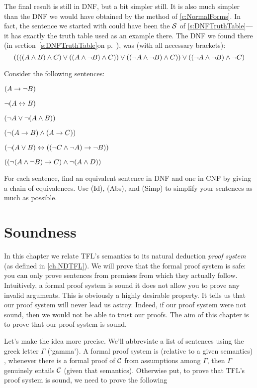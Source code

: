 The final result is still in DNF, but a bit simpler still.  It is also much simpler than the DNF we would have obtained by the method of \cref{c:NormalForms}. In fact, the sentence we started with could have been the $\mathcal{S}$ of \cref{s:DNFTruthTable}---it has exactly the truth table used as an example there. The DNF we found there (\ifHTMLtarget in section~\cref{s:DNFTruthTable}\else on p.~\pageref{longDNF}\fi), was (with all necessary brackets):
$$((((A \wedge B) \wedge C) \vee ((A \wedge \neg B) \wedge C)) \vee ((\neg A \wedge \neg B) \wedge C)) \vee ((\neg A \wedge \neg B) \wedge \neg C)$$

\practiceproblems
\problempart
\label{pr.DNF2}
Consider the following sentences:
\begin{compactlist}
	\item $(A \rightarrow \neg B)$
	\item $\neg (A \leftrightarrow B)$
	\item $(\neg A \vee \neg (A \wedge B))$
	\item $(\neg (A \rightarrow B ) \wedge (A \rightarrow C))$
	\item $(\neg (A \vee B) \leftrightarrow ((\neg C \wedge \neg A) \rightarrow \neg B))$
	\item $((\neg (A \wedge \neg B) \rightarrow C) \wedge \neg (A \wedge D))$
\end{compactlist}
For each sentence, find an equivalent sentence in DNF and one in CNF by giving a chain of equivalences. Use (Id), (Abs), and (Simp) to simplify your sentences as much as possible.

\chapter{Soundness}\label{ch:Soundness}

In this chapter we relate TFL's semantics to its natural deduction \emph{proof system} (as defined in \cref{ch.NDTFL}). We will prove that the formal proof system is safe: you can only prove sentences from premises from which they actually follow.
Intuitively, a formal proof system is sound \ifeff{} it does not allow you to prove any invalid arguments. This is obviously a highly desirable property. It tells us that our proof system will never lead us astray. Indeed, if our proof system were not sound, then we would not be able to trust our proofs. The aim of this chapter is to prove that our proof system is sound.

Let's make the idea more precise. We'll abbreviate a list of sentences using the greek letter $\Gamma$ (`gamma'). A formal proof system is  (relative to a given semantics) \emph{\ifeff}, whenever there is a formal proof of $\mathcal{C}$ from assumptions among $\Gamma$, then $\Gamma$ genuinely entails $\mathcal{C}$ (given that semantics). Otherwise put, to prove that TFL's proof system is sound, we need to prove the following

